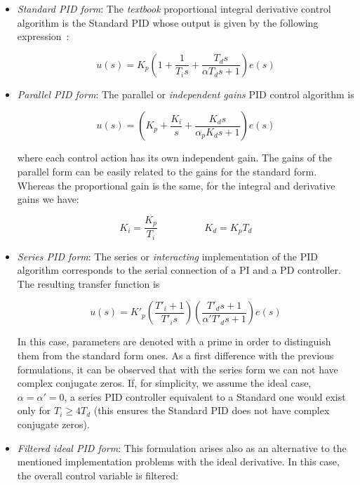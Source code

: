 \begin{itemize}
\item \emph{Standard PID form}: The \emph{textbook} proportional integral derivative control algorithm is the Standard PID whose output is given by the following expression~\cite{astromhagglund1995}:

\begin{equation}
    u(s)= K_p \left( 1 + \frac{1}{T_i s} + \frac{T_d s}{\alpha T_d s+1} \right ) e(s)
\end{equation}

\item \emph{Parallel PID form}: The parallel or \emph{independent gains} PID control algorithm is

\begin{equation}
	u(s) =  \left( K_p + \frac{K_i}{s}+ \frac{K_d s}{\alpha_p K_d s+1}\right) e(s)
\end{equation}

\noindent where each control action has its own independent gain. The gains of the parallel form can be easily related to the gains for the standard form. Whereas the proportional gain is the same, for the integral and derivative gains we have:

\begin{equation}
K_i=\frac{K_p}{T_i} \hspace{2cm}  K_d=K_pT_d 
\end{equation} 

\item \emph{Series PID form}: The  series or \emph{interacting} implementation of the PID algorithm corresponds to the serial connection of a PI and a PD controller. The resulting transfer function is

\begin{equation}
	u(s) = K'_p \left( \frac{T'_i+1}{T'_i s}\right) \left(\frac{T'_d s + 1}{\alpha' T'_d s +1}\right)e(s)
\end{equation}

In this case, parameters are denoted with a prime in order to distinguish them from the standard form ones. As a first difference with the previous formulations, it can be observed that with the series form we can not have complex conjugate zeros. If, for simplicity, we assume the ideal case, $\alpha=\alpha'=0$, a series PID controller equivalent to a Standard one would exist only for $T_i \ge 4 T_d$ (this ensures the Standard PID does not have complex conjugate zeros).

\item \emph{Filtered ideal PID form}: This formulation arises also as an alternative to the mentioned implementation problems with the ideal derivative. In this case, the overall control variable is filtered:


\end{itemize}
